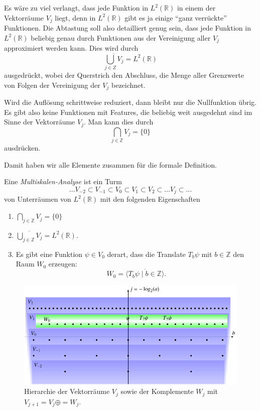 Es wäre zu viel verlangt, dass jede Funktion in $L^2(\mathbb R)$ in
einem der Vektorräume $V_j$ liegt, denn in $L^2(\mathbb R)$ gibt
es ja einige ``ganz verrückte'' Funktionen.
Die Abtastung soll also detailliert genug sein, dass jede 
Funktion in $L^2(\mathbb R)$ beliebig genau durch Funktionen aus
der Vereinigung aller $V_j$ approximiert werden kann.
Dies wird durch
\[
\overline{\bigcup_{j\in Z} V_j} = L^2(\mathbb R)
\]
ausgedrückt, wobei der Querstrich den Abschluss, die Menge aller Grenzwerte
von Folgen der Vereinigung der $V_j$ bezeichnet.

Wird die Auflösung schrittweise reduziert, dann bleibt nur die Nullfunktion
übrig.
Es gibt also keine Funktionen mit Features, die beliebig weit ausgedehnt
sind im Sinne der Vektorräume $V_j$.
Man kann dies durch
\[
\bigcap_{j\in\mathbb Z} V_j = \{0\}
\]
ausdrücken.

Damit haben wir alle Elemente zusammen für die formale Definition.

\begin{definition}
Eine {\em Multiskalen-Analyse} ist ein Turm
\[
\dots
V_{-2}\subset
V_{-1}\subset
V_0\subset
V_1\subset
V_2\subset
\dots
V_j\subset
\dots
\]
von Unterräumen von $L^2(\mathbb R)$
mit den folgenden Eigenschaften
\begin{enumerate}
\item $\bigcap_{j\in\mathbb Z} V_j = \{0\}$
\item $\overline{\bigcup_{j\in\mathbb Z} V_j} = L^2(\mathbb R)$.
\item Es gibt eine Funktion $\psi\in V_0$ derart, dass
die Translate $T_b\psi$ mit $b\in\mathbb Z$ den Raum $W_0$ erzeugen:
\[
W_0 = \overline{\langle T_b\psi\;|\;b\in\mathbb Z\rangle}.
\]
\end{enumerate}
\end{definition}

\begin{figure}
\centering
\includegraphics{chapters/6-msa/images/msa.pdf}
\caption{Hierarchie der Vektorräume $V_j$ sowie der Komplemente $W_j$
mit
$V_{j+1} = V_j \oplus = W_j$.
\label{msa:vektorraumhierarchie}}
\end{figure}

